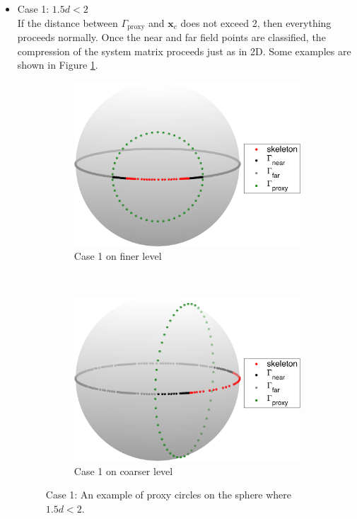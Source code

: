 \documentclass{sfuthesis}
\begin{document}
\begin{itemize}
\item Case 1: $1.5d<2$ \\
If the distance between $\Gamma_{\text{proxy}}$ and $\mathbf{x}_c$ does not exceed 2, then everything proceeds normally. Once the near and far field points are classified, the compression of the system matrix proceeds just as in 2D. Some examples are shown in Figure \ref{fig: Case1}. 

\begin{figure}[h]
        \centering
        \begin{subfigure}[b]{0.4\textwidth}
                \includegraphics[width=\textwidth]{Case1ProxyEx1}
                \caption{Case 1 on finer level}
                       \end{subfigure}%
        ~ 
        \begin{subfigure}[b]{0.4\textwidth}
                \includegraphics[width=\textwidth]{Case1ProxyEx2}
                \caption{Case 1 on coarser level}
                     \end{subfigure}
        \caption{Case 1:  An example of proxy circles on the sphere where $1.5d<2$.}
        \label{fig: Case1}
  \end{figure}



\end{itemize}
\end{document}
